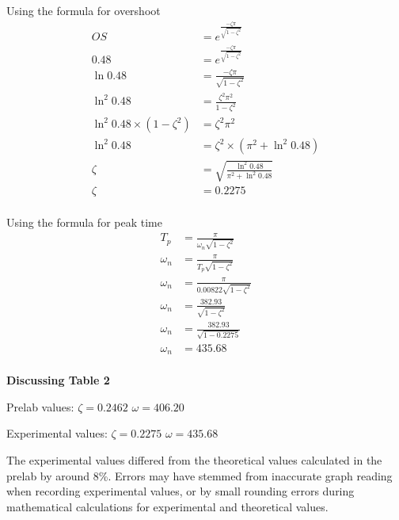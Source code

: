 \documentclass{article}
\begin{document}
Using the formula for overshoot
\begin{align*}
    OS &= e^{\frac{-\zeta\pi}{\sqrt{1-\zeta^2}}}\\
    0.48 &= e^{\frac{-\zeta\pi}{\sqrt{1-\zeta^2}}}\\
    \ln {0.48} &= \frac{-\zeta\pi}{\sqrt{1-\zeta^2}}\\
    \ln^2 {0.48} &= \frac{\zeta^2\pi^2}{1-\zeta^2}\\
    \ln^2 {0.48} \times (1-\zeta^2) &= \zeta^2\pi^2\\
    \ln^2 {0.48} &= \zeta^2 \times (\pi^2 +\ln^2 {0.48}) \\
    \zeta &= \sqrt{\frac{\ln^2 {0.48}}{\pi^2 +\ln^2 {0.48}}} \\
    \zeta &=  0.2275\\
\end{align*}

Using the formula for peak time
\begin{align*}
    T_p &= \frac{\pi}{\omega_n\sqrt{1-\zeta^2}}\\
    \omega_n &= \frac{\pi}{T_p\sqrt{1-\zeta^2}}\\
    \omega_n &= \frac{\pi}{0.00822\sqrt{1-\zeta^2}}\\
    \omega_n &= \frac{382.93}{\sqrt{1-\zeta^2}}\\
    \omega_n &= \frac{382.93}{\sqrt{1-0.2275}}\\
    \omega_n &= 435.68\\
\end{align*}


\textbf{Discussing Table 2}

Prelab values: $\zeta = 0.2462$ $\omega = 406.20$

Experimental values: $\zeta = 0.2275$ $\omega = 435.68$

The experimental values differed from the theoretical values calculated in the prelab by around 8\%. Errors may have stemmed from inaccurate graph reading when recording experimental values, or by small rounding errors during mathematical calculations for experimental and theoretical values.

\newpage
\end{document}

